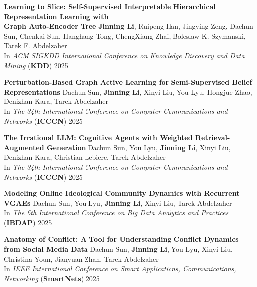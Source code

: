 \documentclass[12pt, letterpaper]{article}
\newcommand{\mhead}[1]{\leavevmode\marginpar{\sffamily\footnotesize #1}}
\begin{document}
\medskip
\mhead{\normalsize{Publications}}\small
\textbf{Learning to Slice: Self-Supervised Interpretable Hierarchical Representation Learning with\\ Graph Auto-Encoder Tree}
\href{http://jinningli.cn/files/papers/learning_to_slice.pdf}{}\href{https://github.com/jinningli/IGAT}{}\newline
\footnotesize
\textbf{Jinning Li}, Ruipeng Han, Jingying Zeng, Dachun Sun, Chenkai Sun, Hanghang Tong, ChengXiang Zhai, Boleslaw K. Szymanski, Tarek F. Abdelzaher\\
In \emph{ACM SIGKDD International Conference on Knowledge Discovery and Data Mining} (\textbf{KDD}) 2025
\small
\vspace{2pt}

\textbf{Perturbation-Based Graph Active Learning for Semi-Supervised Belief Representations}
\href{http://jinningli.cn/files/papers/perturbation_based_AL_icccn25.pdf}{}\href{https://github.com/dsun9/PerbALGraph}{}\newline
\footnotesize
Dachun Sun, \textbf{Jinning Li}, Xinyi Liu, You Lyu, Hongjue Zhao, Denizhan Kara, Tarek Abdelzaher\\
In \emph{The 34th International Conference on Computer Communications and Networks} (\textbf{ICCCN}) 2025
\small
\vspace{2pt}

\textbf{The Irrational LLM: Cognitive Agents with Weighted Retrieval-Augmented Generation}
\href{http://jinningli.cn/files/papers/Irrational_llm_icccn2025.pdf}{}\newline
\footnotesize
Dachun Sun, You Lyu, \textbf{Jinning Li}, Xinyi Liu, Denizhan Kara, Christian Lebiere, Tarek Abdelzaher\\
In \emph{The 34th International Conference on Computer Communications and Networks} (\textbf{ICCCN}) 2025
\small
\vspace{2pt}

\textbf{Modeling Online Ideological Community Dynamics with Recurrent VGAEs}\newline
\footnotesize
Dachun Sun, You Lyu, \textbf{Jinning Li}, Xinyi Liu, Tarek Abdelzaher\\
In \emph{The 6th International Conference on Big Data Analytics and Practices} (\textbf{IBDAP}) 2025
\small
\vspace{2pt}

\textbf{Anatomy of Conflict: A Tool for Understanding Conflict Dynamics from Social Media Data}\newline
\footnotesize
Dachun Sun, \textbf{Jinning Li}, You Lyu, Xinyi Liu, Christina Youn, Jianyuan Zhan, Tarek Abdelzaher\\
In \emph{IEEE International Conference on Smart Applications, Communications, Networking} (\textbf{SmartNets}) 2025
\small
\vspace{2pt}
\end{document}
